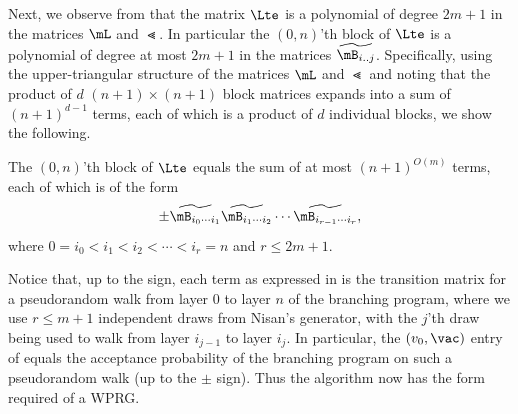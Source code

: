     Next, we observe from  that the matrix $\Lte$ is a polynomial of degree $2m+1$ in the matrices $\mL$ and $\Lt$.  In particular the $(0,n)$'th block of $\Lte$ is a polynomial of degree at most $2m+1$ in the matrices $\widetilde{\mB_{i .. j}}$.  Specifically, using the upper-triangular structure of the matrices $\mL$ and $\Lt$ and noting that the product of $d$ $(n+1)\times (n+1)$ block matrices expands into a sum of $(n+1)^{d-1}$ terms, each of which is a product of $d$ individual blocks, we show the following. %
    
    \begin{observation} \label{obs:path}
    The $(0,n)$'th block of $\Lte$ equals the sum of at most $(n+1)^{O(m)}$ terms, each of which is of the form 
    \begin{equation} \label{eqn:terms}
    \pm \widetilde{\mB_{i_0\cdots i_1}}
    \widetilde{\mB_{i_1\cdots i_2}}
    \cdots
    \widetilde{\mB_{i_{r-1}\cdots i_r}},
    \end{equation}
    where $0=i_0<i_1<i_2<\cdots<i_r=n$ and $r\leq 2m+1$.
    \end{observation}
    
    Notice that, up to the sign, each term as expressed in  is the transition matrix for a pseudorandom walk from layer 0 to layer $n$ of the branching program, where we use $r\leq m+1$ independent draws from Nisan's generator, with the $j$'th draw being used to walk from layer $i_{j-1}$ to layer $i_j$.  In particular,
    the $(v_0,\vac)$ entry of  equals the acceptance probability of the branching program on such a pseudorandom walk (up to the $\pm$ sign).
    Thus the algorithm now has the form required of a WPRG. 
    
